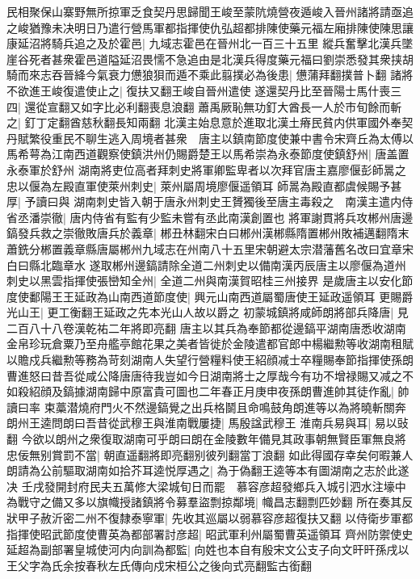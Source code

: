 民相聚保山寨野無所掠軍乏食契丹思歸聞王峻至蒙阬燒營夜遁峻入晉州諸將請亟追之峻猶豫未决明日乃遣行營馬軍都指揮使仇弘超都排陳使藥元福左廂排陳使陳思讓康延沼將騎兵追之及於霍邑|{
	九域志霍邑在晉州北一百三十五里}
縱兵奮擊北漢兵墜崖谷死者甚衆霍邑道隘延沼畏懦不急追由是北漢兵得度藥元福曰劉崇悉發其衆挟胡騎而來志吞晉絳今氣衰力憊狼狽而遁不乘此翦撲必為後患|{
	憊蒲拜翻撲普卜翻}
諸將不欲進王峻復遣使止之|{
	復扶又翻王峻自晉州遣使}
遂還契丹比至晉陽士馬什喪三四|{
	還從宣翻又如字比必利翻喪息浪翻}
蕭禹厥恥無功釘大酋長一人於市旬餘而斬之|{
	釘丁定翻酋慈秋翻長知兩翻}
北漢主始息意於進取北漢土瘠民貧内供軍國外奉契丹賦繁役重民不聊生逃入周境者甚衆　唐主以鎮南節度使兼中書令宋齊丘為太傅以馬希萼為江南西道觀察使鎮洪州仍賜爵楚王以馬希崇為永泰節度使鎮舒州|{
	唐盖置永泰軍於舒州}
湖南將吏位高者拜刺史將軍卿監卑者以次拜官唐主嘉廖偃彭師暠之忠以偃為左殿直軍使萊州刺史|{
	萊州屬周境廖偃遥領耳}
師暠為殿直都虞候賜予甚厚|{
	予讀曰與}
湖南刺史皆入朝于唐永州刺史王贇獨後至唐主毒殺之　南漢主遣内侍省丞潘崇徹|{
	唐内侍省有監有少監未嘗有丞此南漢創置也}
將軍謝貫將兵攻郴州唐邊鎬發兵救之崇徹敗唐兵於義章|{
	郴丑林翻宋白曰郴州漢郴縣隋置郴州敗補邁翻隋末蕭銑分郴置義章縣唐屬郴州九域志在州南八十五里宋朝避太宗潜藩舊名改曰宜章宋白曰縣北臨章水}
遂取郴州邊鎬請除全道二州刺史以備南漢丙辰唐主以廖偃為道州刺史以黑雲指揮使張巒知全州|{
	全道二州與南漢賀昭桂三州接界}
是歲唐主以安化節度使鄱陽王王延政為山南西道節度使|{
	興元山南西道屬蜀唐使王延政遥領耳}
更賜爵光山王|{
	更工衡翻王延政之先本光山人故以爵之}
初蒙城鎮將咸師朗將部兵降唐|{
	見二百八十八卷漢乾祐二年將即亮翻}
唐主以其兵為奉節都從邊鎬平湖南唐悉收湖南金帛珍玩倉粟乃至舟艦亭館花果之美者皆徙於金陵遣都官郎中楊繼勲等收湖南租賦以贍戍兵繼勲等務為苛刻湖南人失望行營糧料使王紹顔减士卒糧賜奉節指揮使孫朗曹進怒曰昔吾從咸公降唐唐待我豈如今日湖南將士之厚哉今有功不增禄賜又减之不如殺紹顔及鎬據湖南歸中原富貴可圖也二年春正月庚申夜孫朗曹進帥其徒作亂|{
	帥讀曰率}
束藁潜燒府門火不然邊鎬覺之出兵格鬬且命鳴鼓角朗進等以為將曉斬關奔朗州王逵問朗曰吾昔從武穆王與淮南戰屢捷|{
	馬殷諡武穆王}
淮南兵易與耳|{
	易以䜴翻}
今欲以朗州之衆復取湖南可乎朗曰朗在金陵數年備見其政事朝無賢臣軍無良將忠佞無别賞罰不當|{
	朝直遥翻將即亮翻别彼列翻當丁浪翻}
如此得國存幸矣何暇兼人朗請為公前驅取湖南如拾芥耳逵悦厚遇之|{
	為于偽翻王逵等本有圖湖南之志於此遂决}
壬戌發開封府民夫五萬修大梁城旬日而罷　慕容彦超發鄉兵入城引泗水注壕中為戰守之備又多以旗幟授諸鎮將令募羣盜剽掠鄰境|{
	幟昌志翻剽匹妙翻}
所在奏其反狀甲子赦沂密二州不復隸泰寧軍|{
	先收其巡屬以弱慕容彦超復扶又翻}
以侍衛步軍都指揮使昭武節度使曹英為都部署討彦超|{
	昭武軍利州屬蜀曹英遥領耳}
齊州防禦使史延超為副部署皇城使河内向訓為都監|{
	向姓也本自有殷宋文公支子向文旰旰孫戌以王父字為氏余按春秋左氏傳向戍宋桓公之後向式亮翻監古銜翻}
